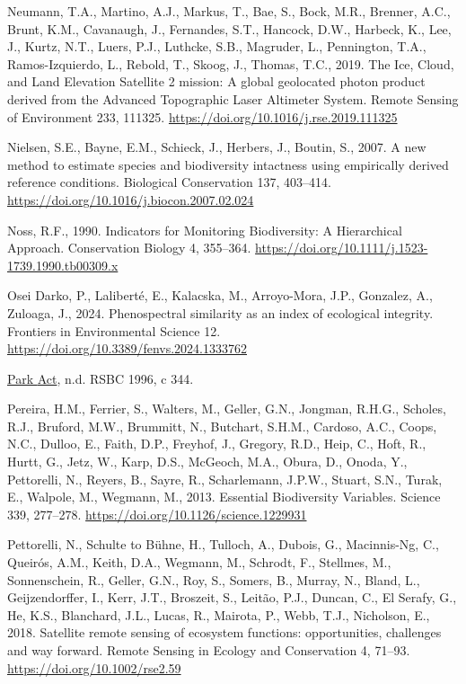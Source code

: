\documentclass[
]{agujournal2019}
\newlength{\cslhangindent}
\newenvironment{CSLReferences}[2] %
 {\begin{list}{}{%
  \setlength{\itemindent}{0pt}
  \setlength{\leftmargin}{0pt}
  \setlength{\parsep}{0pt}
  \ifodd #1
   \setlength{\leftmargin}{\cslhangindent}
   \setlength{\itemindent}{-1\cslhangindent}
  \fi
  \setlength{\itemsep}{#2\baselineskip}}}
 {\end{list}}
\begin{document}
\begin{CSLReferences}{1}{0}
Neumann, T.A., Martino, A.J., Markus, T., Bae, S., Bock, M.R., Brenner,
A.C., Brunt, K.M., Cavanaugh, J., Fernandes, S.T., Hancock, D.W.,
Harbeck, K., Lee, J., Kurtz, N.T., Luers, P.J., Luthcke, S.B., Magruder,
L., Pennington, T.A., Ramos-Izquierdo, L., Rebold, T., Skoog, J.,
Thomas, T.C., 2019. The Ice, Cloud, and Land Elevation Satellite
{\textendash} 2 mission: A global geolocated photon product derived from
the Advanced Topographic Laser Altimeter System. Remote Sensing of
Environment 233, 111325. \url{https://doi.org/10.1016/j.rse.2019.111325}

Nielsen, S.E., Bayne, E.M., Schieck, J., Herbers, J., Boutin, S., 2007.
A new method to estimate species and biodiversity intactness using
empirically derived reference conditions. Biological Conservation 137,
403--414. \url{https://doi.org/10.1016/j.biocon.2007.02.024}

Noss, R.F., 1990. Indicators for Monitoring Biodiversity: A Hierarchical
Approach. Conservation Biology 4, 355--364.
\url{https://doi.org/10.1111/j.1523-1739.1990.tb00309.x}

Osei Darko, P., Laliberté, E., Kalacska, M., Arroyo-Mora, J.P.,
Gonzalez, A., Zuloaga, J., 2024. Phenospectral similarity as an index of
ecological integrity. Frontiers in Environmental Science 12.
\url{https://doi.org/10.3389/fenvs.2024.1333762}

\href{https://www.bclaws.gov.bc.ca/civix/document/id/complete/statreg/96344_01}{Park
{Act}}, n.d. RSBC 1996, c 344.

Pereira, H.M., Ferrier, S., Walters, M., Geller, G.N., Jongman, R.H.G.,
Scholes, R.J., Bruford, M.W., Brummitt, N., Butchart, S.H.M., Cardoso,
A.C., Coops, N.C., Dulloo, E., Faith, D.P., Freyhof, J., Gregory, R.D.,
Heip, C., Hoft, R., Hurtt, G., Jetz, W., Karp, D.S., McGeoch, M.A.,
Obura, D., Onoda, Y., Pettorelli, N., Reyers, B., Sayre, R.,
Scharlemann, J.P.W., Stuart, S.N., Turak, E., Walpole, M., Wegmann, M.,
2013. Essential Biodiversity Variables. Science 339, 277--278.
\url{https://doi.org/10.1126/science.1229931}

Pettorelli, N., Schulte to Bühne, H., Tulloch, A., Dubois, G.,
Macinnis-Ng, C., Queirós, A.M., Keith, D.A., Wegmann, M., Schrodt, F.,
Stellmes, M., Sonnenschein, R., Geller, G.N., Roy, S., Somers, B.,
Murray, N., Bland, L., Geijzendorffer, I., Kerr, J.T., Broszeit, S.,
Leitão, P.J., Duncan, C., El Serafy, G., He, K.S., Blanchard, J.L.,
Lucas, R., Mairota, P., Webb, T.J., Nicholson, E., 2018. Satellite
remote sensing of ecosystem functions: opportunities, challenges and way
forward. Remote Sensing in Ecology and Conservation 4, 71--93.
\url{https://doi.org/10.1002/rse2.59}


\end{CSLReferences}
\end{document}
